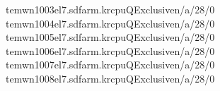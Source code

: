 \documentclass[a4paper,10pt,english]{sphinxmanual}
\begin{document}
\begin{sphinxVerbatim}[commandchars=\\\{\}]
tem\PYGZhy{}wn1003\PYGZhy{}el7.sdfarm.krcpuQExclusiven/a/28/0\PYG{o}{[}\PYG{c+c1}{\PYGZsh{}\PYGZsh{}\PYGZsh{}\PYGZsh{}\PYGZsh{}\PYGZsh{}\PYGZsh{}\PYGZsh{}\PYGZsh{}\PYGZsh{}\PYGZsh{}\PYGZsh{}\PYGZsh{}\PYGZsh{}\PYGZsh{}\PYGZsh{}\PYGZsh{}\PYGZsh{}\PYGZsh{}\PYGZsh{}\PYGZsh{}\PYGZsh{}\PYGZsh{}\PYGZsh{}\PYGZsh{}\PYGZsh{}\PYGZsh{}\PYGZsh{}]}
tem\PYGZhy{}wn1004\PYGZhy{}el7.sdfarm.krcpuQExclusiven/a/28/0\PYG{o}{[}\PYG{c+c1}{\PYGZsh{}\PYGZsh{}\PYGZsh{}\PYGZsh{}\PYGZsh{}\PYGZsh{}\PYGZsh{}\PYGZsh{}\PYGZsh{}\PYGZsh{}\PYGZsh{}\PYGZsh{}\PYGZsh{}\PYGZsh{}\PYGZsh{}\PYGZsh{}\PYGZsh{}\PYGZsh{}\PYGZsh{}\PYGZsh{}\PYGZsh{}\PYGZsh{}\PYGZsh{}\PYGZsh{}\PYGZsh{}\PYGZsh{}\PYGZsh{}\PYGZsh{}]}
tem\PYGZhy{}wn1005\PYGZhy{}el7.sdfarm.krcpuQExclusiven/a/28/0\PYG{o}{[}\PYG{c+c1}{\PYGZsh{}\PYGZsh{}\PYGZsh{}\PYGZsh{}\PYGZsh{}\PYGZsh{}\PYGZsh{}\PYGZsh{}\PYGZsh{}\PYGZsh{}\PYGZsh{}\PYGZsh{}\PYGZsh{}\PYGZsh{}\PYGZsh{}\PYGZsh{}\PYGZsh{}\PYGZsh{}\PYGZsh{}\PYGZsh{}\PYGZsh{}\PYGZsh{}\PYGZsh{}\PYGZsh{}\PYGZsh{}\PYGZsh{}\PYGZsh{}\PYGZsh{}]}
tem\PYGZhy{}wn1006\PYGZhy{}el7.sdfarm.krcpuQExclusiven/a/28/0\PYG{o}{[}\PYG{c+c1}{\PYGZsh{}\PYGZsh{}\PYGZsh{}\PYGZsh{}\PYGZsh{}\PYGZsh{}\PYGZsh{}\PYGZsh{}\PYGZsh{}\PYGZsh{}\PYGZsh{}\PYGZsh{}\PYGZsh{}\PYGZsh{}\PYGZsh{}\PYGZsh{}\PYGZsh{}\PYGZsh{}\PYGZsh{}\PYGZsh{}\PYGZsh{}\PYGZsh{}\PYGZsh{}\PYGZsh{}\PYGZsh{}\PYGZsh{}\PYGZsh{}\PYGZsh{}]}
tem\PYGZhy{}wn1007\PYGZhy{}el7.sdfarm.krcpuQExclusiven/a/28/0\PYG{o}{[}\PYG{c+c1}{\PYGZsh{}\PYGZsh{}\PYGZsh{}\PYGZsh{}\PYGZsh{}\PYGZsh{}\PYGZsh{}\PYGZsh{}\PYGZsh{}\PYGZsh{}\PYGZsh{}\PYGZsh{}\PYGZsh{}\PYGZsh{}\PYGZsh{}\PYGZsh{}\PYGZsh{}\PYGZsh{}\PYGZsh{}\PYGZsh{}\PYGZsh{}\PYGZsh{}\PYGZsh{}\PYGZsh{}\PYGZsh{}\PYGZsh{}\PYGZsh{}\PYGZsh{}]}
tem\PYGZhy{}wn1008\PYGZhy{}el7.sdfarm.krcpuQExclusiven/a/28/0\PYG{o}{[}\PYG{c+c1}{\PYGZsh{}\PYGZsh{}\PYGZsh{}\PYGZsh{}\PYGZsh{}\PYGZsh{}\PYGZsh{}\PYGZsh{}\PYGZsh{}\PYGZsh{}\PYGZsh{}\PYGZsh{}\PYGZsh{}\PYGZsh{}\PYGZsh{}\PYGZsh{}\PYGZsh{}\PYGZsh{}\PYGZsh{}\PYGZsh{}\PYGZsh{}\PYGZsh{}\PYGZsh{}\PYGZsh{}\PYGZsh{}\PYGZsh{}\PYGZsh{}\PYGZsh{}]}

\end{sphinxVerbatim}
\end{document}
